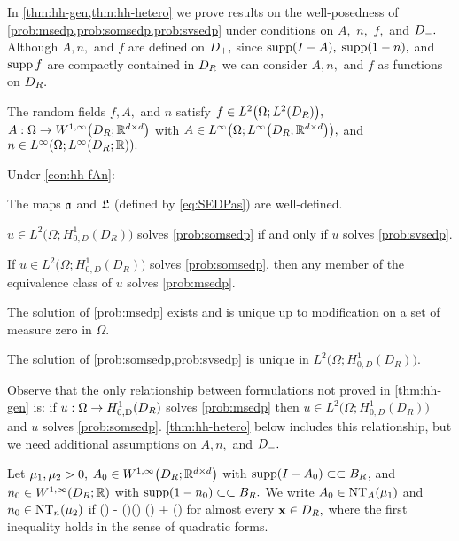 In \cref{thm:hh-gen,thm:hh-hetero} we prove results on the well-posedness of \cref{prob:msedp,prob:somsedp,prob:svsedp} under conditions on $A,$ $n,$ $f,$ and $D_{-}.$ Although $A,n,$ and $f$ are defined on $D_{+},$ since $\operatorname{supp}(I-A),$ $\operatorname{supp}(1-n),$ and $\operatorname{supp} f$ are compactly contained in  $D_{R}$ we can consider $A,n,$ and $f$ as functions on $D_{R}.$

\label{con:hh-fAn}
The random fields $f, A,$ and $n$ satisfy $f \in \LtOLtDR,$  $A:\Omega \rightarrow \WoiDRRRdtd$ with $A \in \LiOLiDRRRdtd,$ and $n \in \LiOLiDRRR.$
\econ

\label{thm:hh-gen}
Under \cref{con:hh-fAn}:
\bit
\item The maps $\mathfrak{a}$ and $\mathfrak{L}$ (defined by \eqref{eq:SEDPas}) are well-defined.
\item $u \in %
L^2\big(\Omega;H_{0,D}^1(D_R)\big)$
solves \cref{prob:somsedp} if and only if $u$ solves \cref{prob:svsedp}.
\item If $u \in
L^2\big(\Omega;H_{0,D}^1(D_R)\big)$
solves \cref{prob:somsedp}, then any member of the equivalence class of $u$ solves \cref{prob:msedp}.
\item The solution of \cref{prob:msedp} exists and is unique up to modification on a set of measure zero in $\Omega.$
\item The solution of \cref{prob:somsedp,prob:svsedp} is unique in $L^2\big(\Omega;H_{0,D}^1(D_R)\big)$. %
\eit
\enth

Observe that the only relationship between formulations not proved in \cref{thm:hh-gen} is: if $u:\Omega\rightarrow \HozDDR$  solves \cref{prob:msedp} then $u \in 
L^2\big(\Omega;H_{0,D}^1(D_R)\big)$
and $u$ solves \cref{prob:somsedp}. \cref{thm:hh-hetero} below includes this relationship, but we need additional assumptions on $A,n,$ and $D_{-}.$

\label{def:hh-nontrapping}
Let $\mu_{1},\mu_{2} >0,$ $\Az \in \WoiDRRRdtd$ with $\operatorname{supp}(I-A_{0}) \subset\subset B_{R}$, and $\nz \in \WoiDRRR$ with $\operatorname{supp}(1-n_{0}) \subset\subset B_{R}.$ We write $\Az \in \NTA{\muo}$ and $\nz \in \NTn{\mut}$ if
\beq\label{eq:hh-Acond}
\Az(\bx) - \mleft(\bx\cdot\grad\mright)\Az(\bx) \geq \muo \quad \tand \quad \nz(\bx) + \bx\cdot\grad \nz(\bx) \geq \mut
\eeq
for almost every $\mathbf{x} \in D_{R},$ where the first inequality holds in the sense of quadratic forms.
\ede

